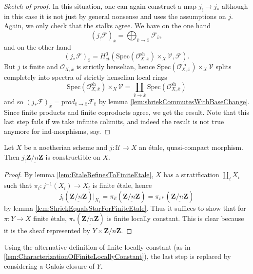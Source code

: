 \begin{proof}[Sketch of proof] 
In this situation, one can again construct a map $j_! \to j_*$ although in this case it is not just by general nonsense and uses the assumptions on $j$. Again, we only check that the stalks agree. We have on the one hand
$$
(j_!\mathcal{F})_{\bar x} = 
\bigoplus_{\bar v \to \bar x} \mathcal{F}_{\bar v},
$$
and on the other hand
$$
\left(j_* \mathcal{F} \right)_{\bar x} = H_{et}^0(\text{Spec}(\mathcal{O}_{X, \bar x}^\text{sh})\times_X \mathcal{V}, \mathcal{F}).
$$
But $j$ is finite and $\mathcal{O}_{X, \bar x}$ is strictly henselian, hence $\text{Spec}(\mathcal{O}_{X, \bar x}^\text{sh})\times_X \mathcal{V}$ splits completely into spectra of strictly henselian  local rings
$$
\text{Spec}(\mathcal{O}_{X, \bar x}^\text{sh})\times_X \mathcal{V} = \coprod_{\bar v \to \bar x} \text{Spec}(\mathcal{O}_{X, \bar x}^\text{sh})
$$
and so $\left(j_* \mathcal{F} \right)_{\bar x} = \text{pr}od_{\bar v \to \bar x} \mathcal{F}_{\bar v}$ by lemma \ref{lem:shriekCommutesWithBaseChange}. Since finite products and finite coproducts agree, we get the result. Note that this last step fails if we take infinite colimits, and indeed the result is not true anymore for ind-morphisms, say.
\end{proof}

\begin{lemma} 
Let $X$ be a noetherian scheme and $j: \mathcal{U} \to X$ an \'etale, quasi-compact morphism. Then $j_!\underline{\mathbf{Z}/n\mathbf{Z}}$ is constructible on $X$. 
\end{lemma}

\begin{proof} 
By lemma \ref{lem:EtaleRefinesToFiniteEtale}, $X$ has a stratification $\coprod_i X_i$ such that $\pi_i: j^{-1}(X_i)\to X_i$ is finite \'etale, hence
$$
j_!(\underline{\mathbf{Z}/n\mathbf{Z}})|_{X_i} = 
\pi_{i!}(\underline{\mathbf{Z}/n\mathbf{Z}}) = 
\pi_{i*}(\underline{\mathbf{Z}/n\mathbf{Z}})
$$
by lemma \ref{lem:ShriekEqualsStarForFiniteEtale}. Thus it suffices to show that for $\pi: Y\to X$ finite \'etale, $\pi_*(\underline{\mathbf{Z}/n\mathbf{Z}})$ is finite locally constant. This is clear because it is the sheaf represented by $Y\times \mathbf{Z}/n\mathbf{Z}$.
\end{proof}

\begin{remark}
Using the alternative definition of finite locally constant (as in \ref{lem:CharacterizationOfFiniteLocallyConstant}), the last step is replaced by considering a Galois closure of $Y$.
\end{remark}

